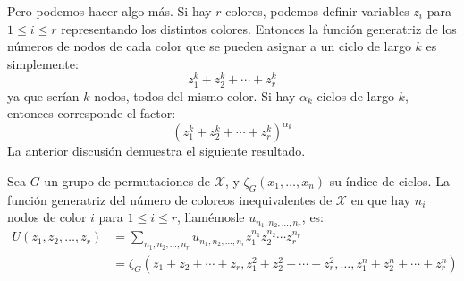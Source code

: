  Pero podemos hacer algo más.
  Si hay \(r\) colores,
  podemos definir variables \(z_i\) para \(1 \le i \le r\)
  representando los distintos colores.
  Entonces la función generatriz
  de los números de nodos de cada color
  que se pueden asignar a un ciclo de largo \(k\) es simplemente:
  \begin{equation*}
    z_1^k + z_2^k + \dotsb + z_r^k
  \end{equation*}
  ya que serían \(k\) nodos,
  todos del mismo color.
  Si hay \(\alpha_k\) ciclos de largo \(k\),
  entonces corresponde el factor:
  \begin{equation*}
    (z_1^k + z_2^k + \dotsb + z_r^k)^{\alpha_k}
  \end{equation*}
  La anterior discusión demuestra el siguiente resultado.
  \begin{theorem}
    \label{theo:Pólya}
    Sea \(G\) un grupo de permutaciones de \(\mathcal{X}\),
    y \(\zeta_G(x_1, \dotsc, x_n)\) su índice de ciclos.
    La función generatriz
    del número de coloreos inequivalentes de \(\mathcal{X}\)
    en que hay \(n_i\) nodos de color \(i\) para \(1 \le i \le r\),
    llamémosle \(u_{n_1, n_2, \dotsc, n_r}\),
    es:
    \begin{align*}
      U(z_1, z_2, \dotsc, z_r)
	&= \sum_{n_1, n_2, \dotsc, n_r}
	     u_{n_1, n_2, \dotsc, n_r} z_1^{n_1} z_2^{n_2}
		\dotsm z_r^{n_r} \\
	&= \zeta_G(z_1 + z_2 + \dotsb + z_r,
		   z_1^2 + z_2^2 + \dotsb + z_r^2,
		   \dotsc,
		   z_1^n + z_2^n + \dotsb + z_r^n)
    \end{align*}
  \end{theorem}

